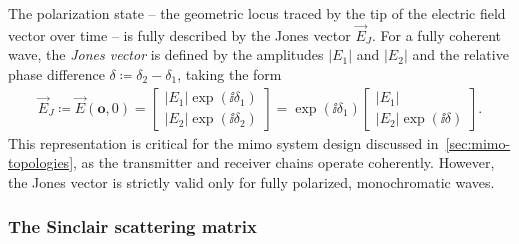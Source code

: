 The polarization state -- the geometric locus traced by the tip of the electric field vector over time -- is fully described by the Jones vector $\vec E_J$.
For a fully coherent wave, the \emph{Jones vector} is defined by the amplitudes $|E_1|$ and $|E_2|$ and the relative phase difference $\delta \coloneq \delta_2 - \delta_1$, taking the form
\begin{align}
    \label{eq:jones-vector}
    \vec E_J \coloneq \vec E(\mathbf o,0) = \begin{bmatrix} |E_1| \exp(\ii\delta_1) \\ |E_2| \exp(\ii\delta_2) \end{bmatrix} = \exp(\ii\delta_1) \begin{bmatrix} |E_1| \\ |E_2| \exp(\ii\delta) \end{bmatrix}.
\end{align}
This representation is critical for the \gls{mimo} system design discussed in~\cref{sec:mimo-topologies}, as the transmitter and receiver chains operate coherently.
However, the Jones vector is strictly valid only for fully polarized, monochromatic waves.


\subsubsection{The Sinclair scattering matrix}
\label{sec:sinclair-matrix}

